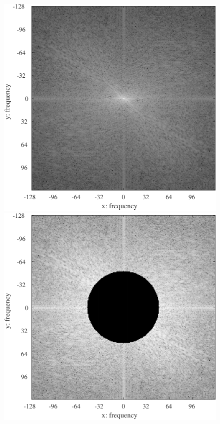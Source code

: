 \begin{figure}[H]
\begin{minipage}[b]{.15\textwidth}
    \end{minipage}
    \begin{minipage}[b]{.15\textwidth}
        \centering
        \includegraphics[keepaspectratio,width=\textwidth]{../../Figures/08_42_fft.pdf}
    \end{minipage}
    \begin{minipage}[b]{.15\textwidth}
        \centering
        \includegraphics[keepaspectratio,width=\textwidth]{../../Figures/08_43_fft-filter.pdf}

\end{minipage}
\end{figure}
